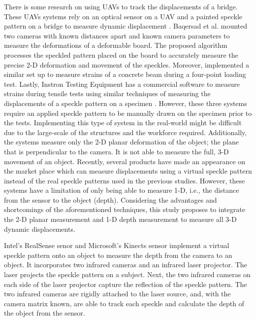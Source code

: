 \documentclass{sigchi}
\begin{document}
There is some research on using UAVs to track the displacements of a bridge. These UAVs systems rely on an optical sensor on a UAV and a painted speckle pattern on a bridge to measure dynamic displacement \cite{Kalaitzakis2019,Catt2019Development}. Baqersad et al. mounted two cameras with known distances apart and known camera parameters to measure the deformations of a deformable board. The proposed algorithm processes the speckled pattern placed on the board to accurately measure the precise 2-D deformation and movement of the speckles. Moreover, \cite{Kalaitzakis2019} implemented a similar set up to measure strains of a concrete beam during a four-point loading test. Lastly, Instron Testing Equipment has a commercial software to measure strains during tensile tests using similar techniques of measuring the displacements of a speckle pattern on a specimen \cite{Instron2017}. However, these three systems require an applied speckle pattern to be manually drawn on the specimen prior to the tests. Implementing this type of system in the real-world might be difficult due to the large-scale of the structures and the workforce required. Additionally, the systems measure only the 2-D planar deformation of the object; the plane that is perpendicular to the camera. It is not able to measure the full, 3-D movement of an object. Recently, several products have made an appearance on the market place which can measure displacements using a virtual speckle pattern instead of the real speckle patterns used in the previous studies. However, these systems have a limitation of only being able to measure 1-D, i.e., the distance from the sensor to the object (depth). Considering the advantages and shortcomings of the aforementioned techniques, this study proposes to integrate the 2-D planar measurement and 1-D depth measurement to measure all 3-D dynamic displacements.

Intel's RealSense senor and Microsoft's Kinects sensor implement a virtual speckle pattern onto an object to measure the depth from the camera to an object. It incorporates two infrared cameras and an infrared laser projector. The laser projects the speckle pattern on a subject. Next, the two infrared cameras on each side of the laser projector capture the reflection of the speckle pattern. The two infrared cameras are rigidly attached to the laser source, and, with the camera matrix known, are able to track each speckle and calculate the depth of the object from the sensor. 
\end{document}
